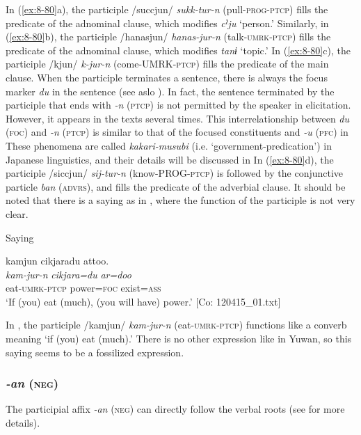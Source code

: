 In (\ref{ex:8-80}a), the participle /succjun/ \textit{sukk-tur-n} (pull-\textsc{prog}-\textsc{ptcp}) fills the predicate of the adnominal clause, which modifies \textit{cˀju} ‘person.’ Similarly, in (\ref{ex:8-80}b), the participle /hanasjun/ \textit{hanas-jur-n} (talk-\textsc{umrk}-\textsc{ptcp}) fills the predicate of the adnominal clause, which modifies \textit{tanɨ} ‘topic.’ In (\ref{ex:8-80}c), the participle /kjun/ \textit{k-jur-n} (come-UMRK-\textsc{ptcp}) fills the predicate of the main clause. When the participle terminates a sentence, there is always the focus marker \textit{du} in the sentence (see aslo ). In fact, the sentence terminated by the participle that ends with \textit{-n} (\textsc{ptcp}) is not permitted by the speaker in elicitation. However, it appears in the texts several times. This interrelationship between \textit{du} (\textsc{foc}) and \textit{-n} (\textsc{ptcp}) is similar to that of the focused constituents and \textit{-u} (\textsc{pfc}) in  These phenomena are called \textit{kakari-musubi} (i.e. ‘government-predication’) in Japanese linguistics, and their details will be discussed in  In (\ref{ex:8-80}d), the participle /siccjun/ \textit{sij-tur-n} (know-PROG-\textsc{ptcp}) is followed by the conjunctive particle \textit{ban} (\textsc{advrs}), and fills the predicate of the adverbial clause. It should be noted that there is a saying as in , where the function of the participle is not very clear.

\ea\label{ex:8-81}
  Saying

  {\TM}
\glll  kamjun  cikjaradu  attoo.\\
\textit{kam-jur-n}  \textit{cikjara=du}  \textit{ar=doo}\\
    eat-\textsc{umrk}-\textsc{ptcp}  power=\textsc{foc}  exist=\textsc{ass}\\
\glt ‘If (you) eat (much), (you will have) power.’ [Co: 120415\_01.txt]
\z

In , the participle /kamjun/ \textit{kam-jur-n} (eat-\textsc{umrk}-\textsc{ptcp}) functions like a converb meaning ‘if (you) eat (much).’ There is no other expression like  in Yuwan, so this saying seems to be a fossilized expression.

\subsubsection{\textit{-an} (\textsc{neg})}

The participial affix \textit{-an} (\textsc{neg}) can directly follow the verbal roots (see  for more details).

